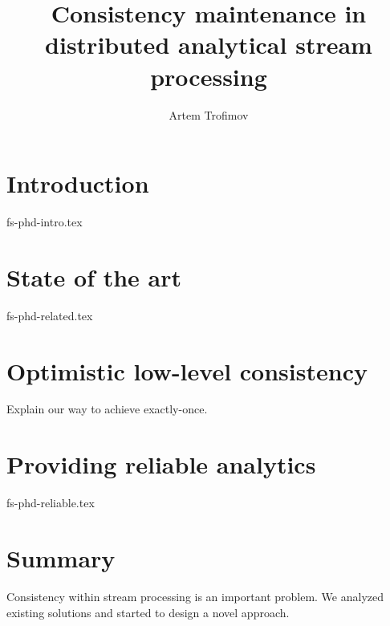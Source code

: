 \documentclass{llncs}
\begin{document}
\title {Consistency maintenance in distributed analytical stream processing}
\author{Artem Trofimov}

\maketitle

\begin{abstract}

\end {abstract}

\section {Introduction}
 {fs-phd-intro.tex}

\section {State of the art}
 {fs-phd-related.tex}

\section {Optimistic low-level consistency}
\label{fs-phd-optimistic}
Explain our way to achieve exactly-once.

\section{Providing reliable analytics}
 {fs-phd-reliable.tex}


\section {Summary}
\label{fs-phd-summary}
Consistency within stream processing is an important problem. We analyzed existing solutions and started to design a novel approach.



\end{document}
